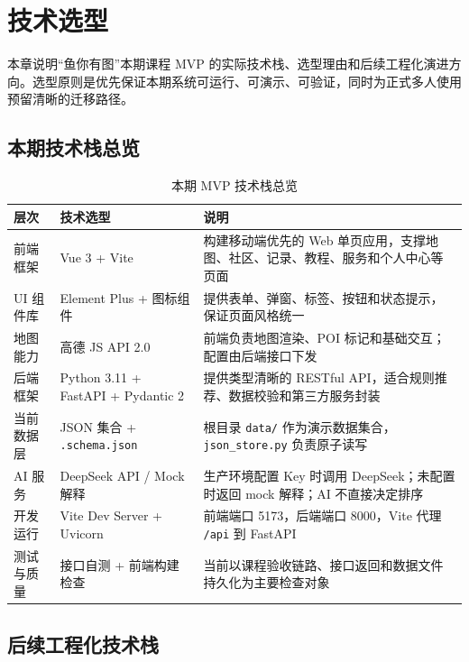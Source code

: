 \section{技术选型}

本章说明“鱼你有图”本期课程 MVP 的实际技术栈、选型理由和后续工程化演进方向。选型原则是优先保证本期系统可运行、可演示、可验证，同时为正式多人使用预留清晰的迁移路径。

\subsection{本期技术栈总览}

\begin{table}[H]
  \centering
  \caption{本期 MVP 技术栈总览}
  \label{tab:tech-stack}
  \begin{tabularx}{\textwidth}{p{3cm}|p{4.6cm}|X}
    \toprule
    \textbf{层次} & \textbf{技术选型} & \textbf{说明} \\
    \midrule
    前端框架 & Vue 3 + Vite & 构建移动端优先的 Web 单页应用，支撑地图、社区、记录、教程、服务和个人中心等页面 \\
    \hline
    UI 组件库 & Element Plus + 图标组件 & 提供表单、弹窗、标签、按钮和状态提示，保证页面风格统一 \\
    \hline
    地图能力 & 高德 JS API 2.0 & 前端负责地图渲染、POI 标记和基础交互；配置由后端接口下发 \\
    \hline
    后端框架 & Python 3.11 + FastAPI + Pydantic 2 & 提供类型清晰的 RESTful API，适合规则推荐、数据校验和第三方服务封装 \\
    \hline
    当前数据层 & JSON 集合 + \texttt{.schema.json} & 根目录 \texttt{data/} 作为演示数据集合，\texttt{json\_store.py} 负责原子读写 \\
    \hline
    AI 服务 & DeepSeek API / Mock 解释 & 生产环境配置 Key 时调用 DeepSeek；未配置时返回 mock 解释；AI 不直接决定排序 \\
    \hline
    开发运行 & Vite Dev Server + Uvicorn & 前端端口 5173，后端端口 8000，Vite 代理 \texttt{/api} 到 FastAPI \\
    \hline
    测试与质量 & 接口自测 + 前端构建检查 & 当前以课程验收链路、接口返回和数据文件持久化为主要检查对象 \\
    \bottomrule
  \end{tabularx}
\end{table}

\subsection{后续工程化技术栈}

